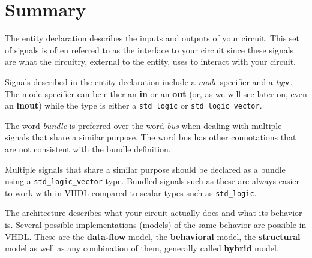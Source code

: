 \section{Summary}
\begin{my_list}
\item The entity declaration describes the inputs and outputs of your circuit. This set of signals is often referred to as the interface to your circuit since these signals are what the circuitry, external to the entity, uses to interact with your circuit.
\item Signals described in the entity declaration include a \textit{mode} specifier and a \textit{type}. The mode specifier can be either an \textbf{in} or an \textbf{out} (or, as we will see later on, even an \textbf{inout}) while the type is either a \texttt{std\_logic} or \texttt{std\_logic\_vector}.
\item The word \textit{bundle} is preferred over the word \textit{bus} when dealing with multiple signals that share a similar purpose. The word bus has other connotations that are not consistent with the bundle definition.
\item Multiple signals that share a similar purpose should be declared as a bundle using a \texttt{std\_logic\_vector} type. Bundled signals such as these are always easier to work with in VHDL compared to scalar types such as \texttt{std\_logic}.
\item The architecture describes what your circuit actually does and what its behavior is. Several possible implementations (models) of the same behavior are possible in VHDL. These are the \textbf{data-flow} model, the \textbf{behavioral} model, the \textbf{structural} model as well as any combination of them, generally called \textbf{hybrid} model.
\end{my_list}

